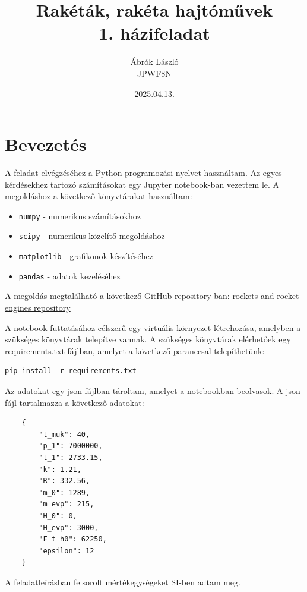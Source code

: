 \documentclass[a4paper,12pt]{article}
\title{Rakéták, rakéta hajtóművek\\ 1. házifeladat}
\author{Ábrók László\\ JPWF8N}
\date{2025.04.13.} %
\begin{document}
\maketitle
\newpage



\section{Bevezetés}
A feladat elvégzéséhez a Python programozási nyelvet használtam. Az egyes kérdésekhez tartozó számításokat egy Jupyter notebook-ban vezettem le.
A megoldáshoz a következő könyvtárakat használtam:
\begin{itemize}
    \item \texttt{numpy} - numerikus számításokhoz
    \item \texttt{scipy} - numerikus közelítő megoldáshoz
    \item \texttt{matplotlib} - grafikonok készítéséhez
    \item \texttt{pandas} - adatok kezeléséhez
\end{itemize}
A megoldás megtalálható a következő GitHub repository-ban:
\href{https://github.com/LaszloAbrok/rockets-and-rocket-engines}{rockets-and-rocket-engines repository}

A notebook futtatásához célszerű egy virtuális környezet létrehozása, amelyben a szükséges könyvtárak telepítve vannak.
A szükséges könyvtárak elérhetőek egy requirements.txt fájlban, amelyet a következő paranccsal telepíthetünk:
\begin{verbatim}
pip install -r requirements.txt
\end{verbatim}

Az adatokat egy json fájlban tároltam, amelyet a notebookban beolvasok. A json fájl tartalmazza a következő adatokat:
\begin{verbatim}
    {
        "t_muk": 40,
        "p_1": 7000000,
        "t_1": 2733.15,
        "k": 1.21,
        "R": 332.56,
        "m_0": 1289,
        "m_evp": 215,
        "H_0": 0,
        "H_evp": 3000,
        "F_t_h0": 62250,
        "epsilon": 12
    }
\end{verbatim}

A feladatleírásban felsorolt mértékegységeket SI-ben adtam meg.
\end{document}
